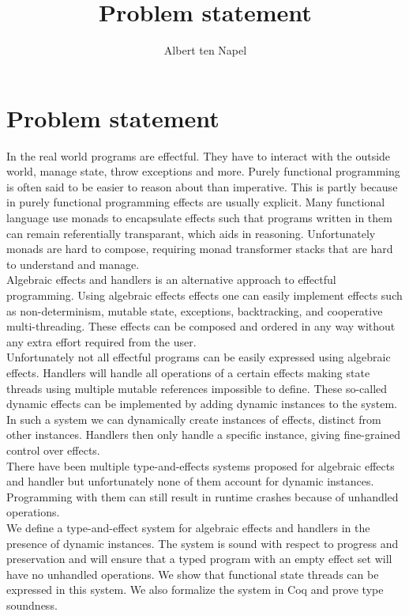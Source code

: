 \documentclass[12pt]{article}
\title{Problem statement}
\author{Albert ten Napel}
\date{}
\begin{document}
\maketitle




\section{Problem statement}
In the real world programs are effectful. They have to interact with the outside world, manage state, throw exceptions and more.
Purely functional programming is often said to be easier to reason about than imperative.
This is partly because in purely functional programming effects are usually explicit.
Many functional language use monads to encapsulate effects such that programs written in them can remain referentially transparant, which aids in reasoning.
Unfortunately monads are hard to compose, requiring monad transformer stacks that are hard to understand and manage.
\\
Algebraic effects and handlers is an alternative approach to effectful programming.
Using algebraic effects effects one can easily implement effects such as non-determinism, mutable state, exceptions, backtracking, and cooperative multi-threading.
These effects can be composed and ordered in any way without any extra effort required from the user.
\\
Unfortunately not all effectful programs can be easily expressed using algebraic effects.
Handlers will handle all operations of a certain effects making state threads using multiple mutable references impossible to define.
These so-called dynamic effects can be implemented by adding dynamic instances to the system.
In such a system we can dynamically create instances of effects, distinct from other instances.
Handlers then only handle a specific instance, giving fine-grained control over effects.
\\
There have been multiple type-and-effects systems proposed for algebraic effects and handler but unfortunately none of them account for dynamic instances. Programming with them can still result in runtime crashes because of unhandled operations.
\\
We define a type-and-effect system for algebraic effects and handlers in the presence of dynamic instances.
The system is sound with respect to progress and preservation and will ensure that a typed program with an empty effect set will have no unhandled operations.
We show that functional state threads can be expressed in this system.
We also formalize the system in Coq and prove type soundness.
\end{document}
